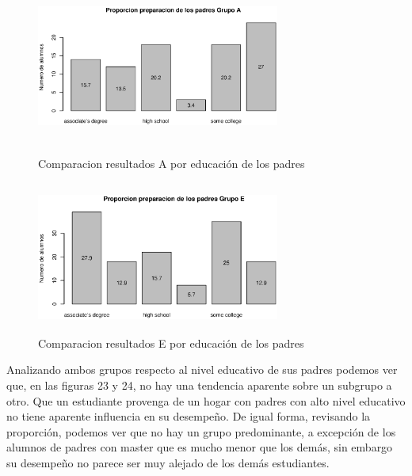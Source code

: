 \documentclass{article}
\begin{document}
    \begin{figure}[H]
        \begin{minipage}[b]{0.45\linewidth}
            \includegraphics[width=8cm,height = 5cm]{Output/Plots/figure17.eps}
            \vspace*{-8.5mm}
            \caption{Comparacion resultados A por educaci\'on de los padres}
            \label{fig:minipage1}
        \end{minipage}
        \hspace{0.2cm}
        \begin{minipage}[b]{0.45\linewidth}
            \includegraphics[width=8cm,height = 5cm]{Output/Plots/figure18.eps}
            \vspace*{-9mm}
            \caption{Comparacion resultados E por educaci\'on de los padres}
            \label{fig:minipage2}
        \end{minipage}
    \end{figure}


    Analizando ambos grupos respecto al nivel educativo de sus padres podemos ver que, en las figuras 23 y 24, no 
    hay una tendencia aparente sobre un subgrupo a otro. Que un estudiante provenga de un hogar con padres
    con alto nivel educativo no tiene aparente influencia en su desempe\~no. De igual forma, revisando la proporci\'on,
    podemos ver que no hay un grupo predominante, a excepci\'on de los alumnos de padres con master que es mucho menor
    que los dem\'as, sin embargo su desempe\~no no parece ser muy alejado de los dem\'as estudiantes.
\end{document}
